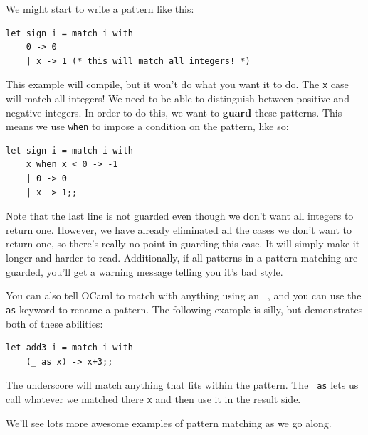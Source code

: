 \documentclass[10pt]{book}
\begin{document}
We might start to write a pattern like this:

\beforeverb
\begin{verbatim}
let sign i = match i with 
	0 -> 0
	| x -> 1 (* this will match all integers! *)
\end{verbatim}
\afterverb

This example will compile, but it won't do what you want it to do.
The {\tt x} case will match all integers! We need to be able to 
distinguish between positive and negative integers. In order to do this,
we want to {\bf guard} these patterns. This means we use {\tt when} to 
impose a condition on the pattern, like so:

\beforeverb
\begin{verbatim}
let sign i = match i with
	x when x < 0 -> -1
	| 0 -> 0
	| x -> 1;;
\end{verbatim}
\afterverb

Note that the last line is not guarded even though we don't want all 
integers to return one. However, we have already eliminated all the 
cases we don't want to return one, so there's really no point in guarding
this case. It will simply make it longer and harder to read. Additionally,
if all patterns in a pattern-matching are guarded, you'll get a warning 
message telling you it's bad style.

You can also tell OCaml to match with anything using an \verb"_", and you
can use the {\tt as} keyword to rename a pattern. The following example is
silly, but demonstrates both of these abilities:

\beforeverb
\begin{verbatim}
let add3 i = match i with
	(_ as x) -> x+3;;
\end{verbatim}
\afterverb

The underscore will match anything that fits within the pattern. The {\tt 
as} lets us call whatever we matched there {\tt x} and then use it in the
result side.

We'll see lots more awesome examples of pattern matching as we go along.
\end{document}

